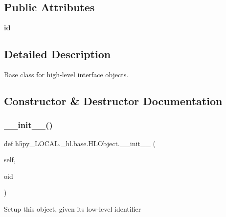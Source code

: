 \subsection*{Public Attributes}
\begin{DoxyCompactItemize}
\item 
\mbox{\label{classh5py__LOCAL_1_1__hl_1_1base_1_1HLObject_a644f43c8f78afb4f227f959d14b57638}} 
{\bfseries id}
\end{DoxyCompactItemize}


\subsection{Detailed Description}
\begin{DoxyVerb}    Base class for high-level interface objects.
\end{DoxyVerb}
 

\subsection{Constructor \& Destructor Documentation}
\mbox{\label{classh5py__LOCAL_1_1__hl_1_1base_1_1HLObject_a8a5eec33c2869d06e1d39dddba4eb325}} 
\subsubsection{\texorpdfstring{\+\_\+\+\_\+init\+\_\+\+\_\+()}{\_\_init\_\_()}}
{\footnotesize\ttfamily def h5py\+\_\+\+L\+O\+C\+A\+L.\+\_\+hl.\+base.\+H\+L\+Object.\+\_\+\+\_\+init\+\_\+\+\_\+ (\begin{DoxyParamCaption}\item[{}]{self,  }\item[{}]{oid }\end{DoxyParamCaption})}

\begin{DoxyVerb}Setup this object, given its low-level identifier \end{DoxyVerb}
 

